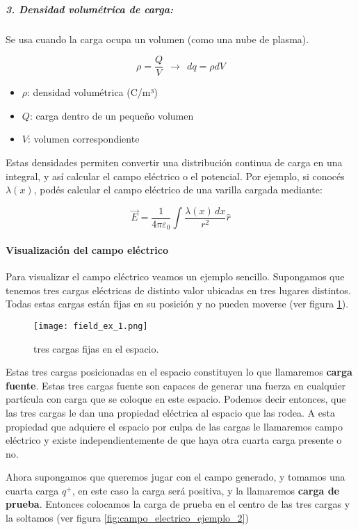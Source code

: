 \subparagraph{3. Densidad volumétrica de carga:}

Se usa cuando la carga ocupa un volumen (como una nube de plasma).

\[
\rho = \frac{Q}{V} ~ ~ \rightarrow ~ ~ dq = \rho dV
\]

\begin{itemize}
    \item \( \rho \): densidad volumétrica (C/m³)  
    \item \( Q \): carga dentro de un pequeño volumen  
    \item \( V \): volumen correspondiente  
\end{itemize}


Estas densidades permiten convertir una distribución continua de carga en una integral, y así calcular el campo eléctrico o el potencial.  
Por ejemplo, si conocés \( \lambda(x) \), podés calcular el campo eléctrico de una varilla cargada mediante:

\[
\vec{E} = \frac{1}{4\pi\varepsilon_0} \int \frac{\lambda(x)\, dx}{r^2} \hat{r}
\]

\paragraph{Visualización del campo eléctrico}

Para visualizar el campo eléctrico veamos un ejemplo sencillo. Supongamos que tenemos tres cargas eléctricas de distinto valor ubicadas en tres lugares distintos. Todas estas cargas están fijas en su posición y no pueden moverse (ver figura \ref{fig:campo_electrico_ejemplo_1}). 

\begin{figure}[ht]
    \centering
    \texttt{[image: field\_ex\_1.png]}
    \caption{tres cargas fijas en el espacio.}
    \label{fig:campo_electrico_ejemplo_1}
\end{figure}

Estas tres cargas posicionadas en el espacio constituyen lo que llamaremos \textbf{carga fuente}. Estas tres cargas fuente son capaces de generar una fuerza en cualquier partícula con carga que se coloque en este espacio. Podemos decir entonces, que las tres cargas le dan una propiedad eléctrica al espacio que las rodea. A esta propiedad que adquiere el espacio por culpa de las cargas le llamaremos campo eléctrico y existe independientemente de que haya otra cuarta carga presente o no.

Ahora supongamos que queremos jugar con el campo generado, y tomamos una cuarta carga \( q^{+} \), en este caso la carga será positiva, y la llamaremos \textbf{carga de prueba}. Entonces colocamos la carga de prueba en el centro de las tres cargas y la soltamos (ver figura \ref{fig:campo_electrico_ejemplo_2})


